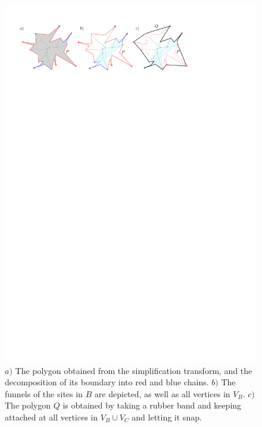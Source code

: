\documentclass[a4paper, 11pt]{article}
\begin{document}
\begin{figure}[t]
\centering
\includegraphics{imgReduction.pdf}
\caption{$a)$ The polygon obtained from the simplification transform, and the decomposition of its boundary into red and blue chains.
$b)$ The funnels of the sites in $B$ are depicted, as well as all vertices in $V_B$.
$c)$ The polygon $Q$ is obtained by taking a rubber band and keeping attached at all vertices in $V_B\cup V_C$ and letting it snap. }
\label{fig:Reduction}
\end{figure}
\end{document}
